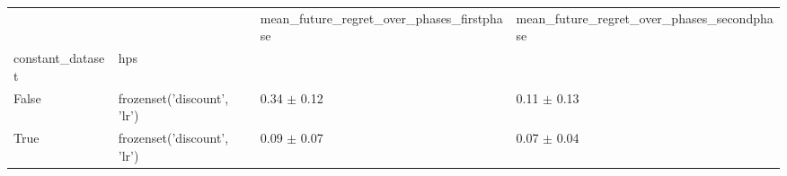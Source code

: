 \begin{tabular}{llll}
\toprule
 &  & mean_future_regret_over_phases_firstphase & mean_future_regret_over_phases_secondphase \\
constant_dataset & hps &  &  \\
\midrule
False & frozenset({'discount', 'lr'}) & 0.34 $\pm$ 0.12 & 0.11 $\pm$ 0.13 \\
\cline{1-4}
True & frozenset({'discount', 'lr'}) & 0.09 $\pm$ 0.07 & 0.07 $\pm$ 0.04 \\
\cline{1-4}
\bottomrule
\end{tabular}
